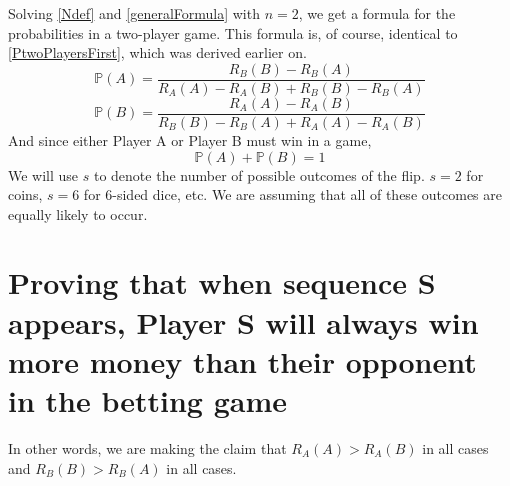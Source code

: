 \documentclass[english,12pt,a4paper,final]{article}
\begin{document}
Solving \eqref{Ndef} and \eqref{generalFormula} with $n=2$, we get a formula for the probabilities in a two-player game. This formula is, of course, identical to \eqref{PtwoPlayersFirst}, which was derived earlier on.
\begin{equation}\label{2playerAProb}
	\mathbb{P}(A)=\frac{R_B(B)-R_B(A)}{R_A(A)-R_A(B)+R_B(B)-R_B(A)}
\end{equation}
\begin{equation}\label{2playerBProb}
	\mathbb{P}(B)=\frac{R_A(A)-R_A(B)}{R_B(B)-R_B(A)+R_A(A)-R_A(B)}
\end{equation}
And since either Player A or Player B must win in a game,
\begin{equation*}
	\mathbb{P}(A)+\mathbb{P}(B)=1
\end{equation*}
We will use $s$ to denote the number of possible outcomes of the flip. $s=2$ for coins, $s=6$ for 6-sided dice, etc. We are assuming that all of these outcomes are equally likely to occur.

\section{Proving that when sequence S appears, Player S will always win more money than their opponent in the betting game}

In other words, we are making the claim that $R_A(A)>R_A(B)$ in all cases and $R_B(B)>R_B(A)$ in all cases.
\end{document}
